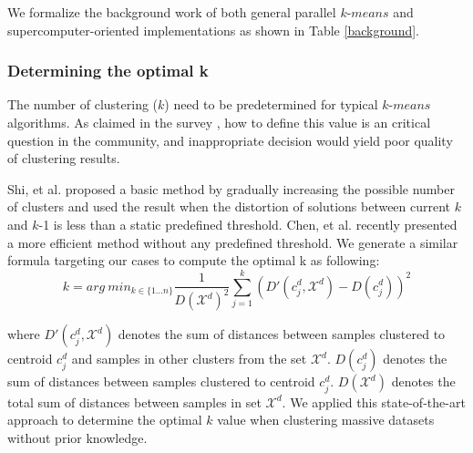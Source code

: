 We formalize the background work of both general parallel $k$-$means$ and supercomputer-oriented implementations as shown in Table \ref{background}.

\subsubsection{Determining the optimal k}\label{background_J}
The number of clustering ($k$) need to be predetermined for typical $k$-$means$ algorithms. As claimed in the survey \cite{zhang2012review}, how to define this value is an critical question in the community, and inappropriate decision would yield poor quality of clustering results. 

Shi, et al. \cite{shi2004adaptive} proposed a basic method by gradually increasing the possible number of clusters and used the result when the distortion of solutions between current $k$ and $k$-1 is less than a static predefined threshold.
Chen, et al. \cite{chen2018improved} recently presented a more efficient method without any predefined threshold. We generate a similar formula targeting our cases to compute the optimal k as following:
$$ k = arg\ min_{k \in \{ 1 \dots n\}} \frac{1}{D(\mathcal{X}^d)^2} \sum_{j=1}^{k} ( D'(c_j^d,\mathcal{X}^d) -  D(c_j^d))^2  $$

where $D'(c_j^d,\mathcal{X}^d)$ denotes the sum of distances between samples clustered to centroid $c_j^d$ and samples in other clusters from the set $\mathcal{X}^d$. $D(c_j^d)$ denotes the sum of distances between samples clustered to centroid $c_j^d$. $D(\mathcal{X}^d)$ denotes the total sum of distances between samples in set $\mathcal{X}^d$. 
We applied this state-of-the-art approach to determine the optimal $k$ value when clustering massive datasets without prior knowledge. 

